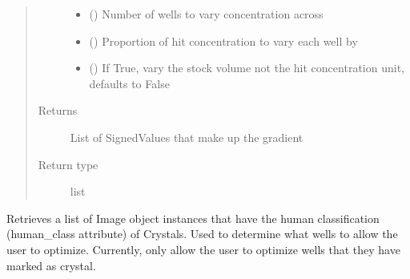 \documentclass[letterpaper,10pt,english]{sphinxmanual}
\begin{document}
\begin{fulllineitems}
\begin{fulllineitems}
\begin{quote}
\begin{description}
\begin{itemize}
\item {} 
 () \textendash{} Number of wells to vary concentration across

\item {} 
 () \textendash{} Proportion of hit concentration to vary each well by

\item {} 
 (\sphinxstyleliteralemphasis{\sphinxupquote{, }}) \textendash{} If True, vary the stock volume not the hit             concentration unit, defaults to False

\end{itemize}

\item[{Returns}] \leavevmode
List of SignedValues that make up the gradient

\item[{Return type}] \leavevmode
list

\end{description}\end{quote}

\end{fulllineitems}


\begin{fulllineitems}
\label{\detokenize{polo.widgets:polo.widgets.optimize_widget.OptimizeWidget.handle_reagent_change}}
\end{fulllineitems}


\begin{fulllineitems}
\label{\detokenize{polo.widgets:polo.widgets.optimize_widget.OptimizeWidget.hit_images}}
Retrieves a list of Image object instances that have the human
classification (human\_class attribute) of Crystals. Used to
determine what wells to allow the user to optimize. Currently, only
allow the user to optimize wells that they have marked as crystal.


\end{fulllineitems}
\end{fulllineitems}
\end{document}
